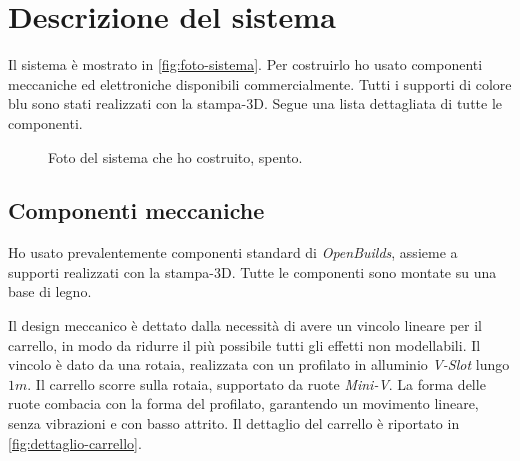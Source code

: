 \section{Descrizione del sistema}
\label{sec:sistema-reale}
Il sistema è mostrato in \autoref{fig:foto-sistema}.
Per costruirlo ho usato componenti meccaniche ed elettroniche
disponibili commercialmente. Tutti i supporti di colore blu sono stati
realizzati con la stampa-3D. Segue una lista dettagliata di tutte le componenti.

\begin{figure}[H]
    \centering
    \caption[Foto del sistema]{Foto del sistema che ho costruito, spento.}
    \label{fig:foto-sistema}
\end{figure}

\subsection{Componenti meccaniche}
\label{subsec:componenti-meccaniche}
Ho usato prevalentemente componenti standard di \emph{OpenBuilds},
assieme a supporti realizzati con la stampa-3D.
Tutte le componenti sono montate su una base di legno.

Il design meccanico è dettato dalla necessità di avere un vincolo
lineare per il carrello,
in modo da ridurre il più possibile tutti gli effetti non modellabili.
Il vincolo è dato da una rotaia, realizzata con un profilato in alluminio
\emph{V-Slot} lungo $1m$. Il carrello scorre sulla rotaia, supportato da
ruote \emph{Mini-V}. La forma delle ruote combacia con la forma del profilato, garantendo un movimento lineare, senza vibrazioni e con basso attrito.
Il dettaglio del carrello è riportato in \autoref{fig:dettaglio-carrello}.

